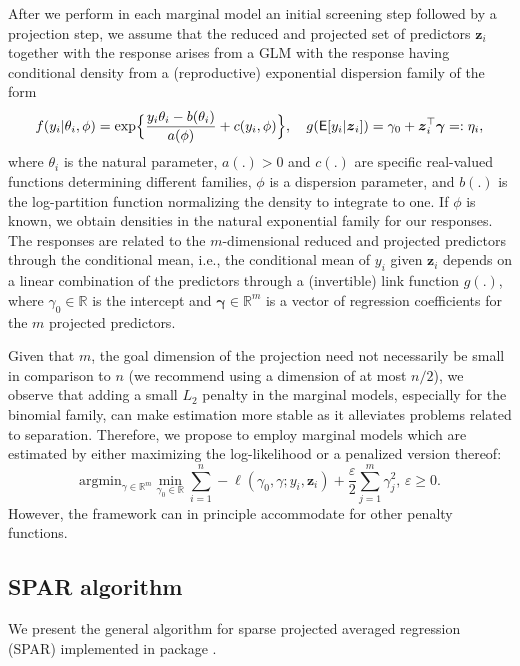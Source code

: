\documentclass[
  article,
  nojss]{jss}
\begin{document}
After we perform in each marginal model an initial screening step
followed by a projection step, we assume that the reduced and projected
set of predictors \(\boldsymbol{z}_i\) together with the response arises
from a GLM with the response having conditional density from a
(reproductive) exponential dispersion family of the form
\begin{align*}\label{eqn:y_density}
  f(y_i|\theta_i,\phi) = \exp\Bigl\{\frac{y_i\theta_i- b(\theta_i)}{a(\phi)} + c(y_i,\phi)\Bigr\},
  \quad
    g(\mathsf{E}[y_i|\boldsymbol{z}_i]) = \gamma_0 + \boldsymbol{z}_i^\top\boldsymbol{\gamma}=:\eta_i,
\end{align*} where \(\theta_i\) is the natural parameter, \(a(.)>0\) and
\(c(.)\) are specific real-valued functions determining different
families, \(\phi\) is a dispersion parameter, and \(b(.)\) is the
log-partition function normalizing the density to integrate to one. If
\(\phi\) is known, we obtain densities in the natural exponential family
for our responses. The responses are related to the \(m\)-dimensional
reduced and projected predictors through the conditional mean, i.e., the
conditional mean of \(y_i\) given \({\boldsymbol{z}}_i\) depends on a
linear combination of the predictors through a (invertible) link
function \(g(.)\), where \(\gamma_0\in\mathbb{R}\) is the intercept and
\(\boldsymbol{\gamma}\in\mathbb{R}^m\) is a vector of regression
coefficients for the \(m\) projected predictors.

Given that \(m\), the goal dimension of the projection need not
necessarily be small in comparison to \(n\) (we recommend using a
dimension of at most \(n/2\)), we observe that adding a small \(L_2\)
penalty in the marginal models, especially for the binomial family, can
make estimation more stable as it alleviates problems related to
separation. Therefore, we propose to employ marginal models which are
estimated by either maximizing the log-likelihood or a penalized version
thereof: \[
 \text{argmin}_{{\gamma}\in\mathbb{R}^m}\min_{\gamma_0\in\mathbb{R}}  \sum_{i=1}^n -\ell(\gamma_0, \gamma;y_i,\boldsymbol{z}_i) + \frac{\varepsilon}{2}\sum_{j=1}^m{\gamma}_j^2, \, \varepsilon \geq 0.
\] However, the framework can in principle accommodate for other penalty
functions.

\subsection{SPAR algorithm}\label{sec-algo}

We present the general algorithm for sparse projected averaged
regression (SPAR) implemented in package .
\end{document}
